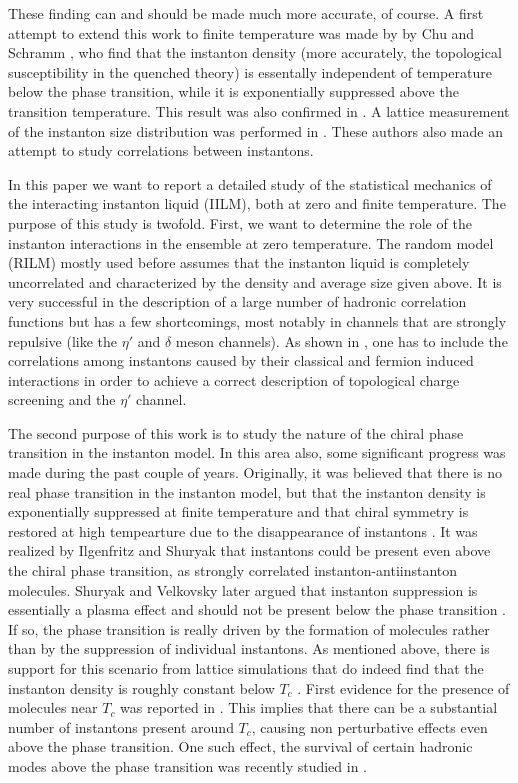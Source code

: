    These finding can and should be made much more accurate, of course.
A first attempt to extend this work to finite temperature was made by
by Chu and Schramm \cite{CS_95}, who find that the instanton density
(more accurately, the topological susceptibility in the quenched theory)
is essentally independent of temperature below the phase transition,
while it is exponentially suppressed above the transition temperature.
This result was also confirmed in \cite{IMM_95}. A lattice measurement
of the instanton size distribution was performed in \cite{MS_95}.
These authors also made an attempt to study correlations between
instantons.

   In this paper we want to report a detailed study of the statistical
mechanics of the interacting instanton liquid (IILM), both at zero and
finite temperature. The purpose of this study is twofold. First, we want
to determine the role of the instanton interactions in the ensemble at
zero temperature. The random model (RILM) mostly used before assumes that
the instanton liquid is completely uncorrelated and characterized
by the density and average size given above. It is very successful
in the description of a large number of hadronic correlation
functions \cite{SV_93} but has a few shortcomings, most notably in
channels that are strongly repulsive (like the $\eta'$ and $\delta$
meson channels). As shown in \cite{SV_95,SS_95}, one has to include
the correlations among instantons caused by their classical and
fermion induced interactions in order to achieve a correct description
of topological charge screening and the $\eta'$ channel.

   The second purpose of this work is to study the nature of the
chiral phase transition in the instanton model. In this area also,
some significant progress was made during the past couple of years.
Originally, it was believed that there is no real phase transition
in the instanton model, but that the instanton density is exponentially
suppressed at finite temperature \cite{PY_80} and that chiral symmetry
is restored at high tempearture due to the disappearance of instantons
\cite{Shu_82,DM_88,NVZ_89}. It was realized by Ilgenfritz and Shuryak
\cite{IS_89} that instantons could be present even above the chiral
phase transition, as strongly correlated instanton-antiinstanton
molecules. Shuryak and Velkovsky later argued that instanton suppression
is essentially a plasma effect and should not be present below the
phase transition \cite{SV_94}. If so, the phase transition is really
driven by the formation of molecules \cite{IS_94,SSV_95} rather than
by the suppression of individual instantons. As mentioned above, there is
support for this scenario from lattice simulations that do indeed find that
the instanton density is roughly constant below $T_c$ \cite{CS_95}.
First evidence for the presence of molecules near $T_c$ was reported
in \cite{IMM_95}. This implies that there can be a substantial number of
instantons present around $T_c$, causing non perturbative effects even
above the phase transition. One such effect, the survival of certain
hadronic modes above the phase transition was recently studied in
\cite{SS_95b}.

